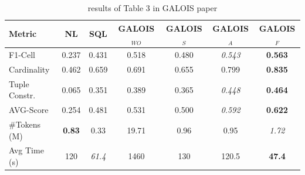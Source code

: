 \documentclass[11pt]{article}
\begin{document}
\begin{table}[H]
\centering
\caption{results of Table 3 in GALOIS paper}
\label{tab:galois_table3}
\begin{tabular}{lcccccc}
\hline
\textbf{Metric} 
& \textbf{NL} 
& \textbf{SQL} 
& \textbf{GALOIS$_{WO}$} 
& \textbf{GALOIS$_S$} 
& \textbf{GALOIS$_A$} 
& \textbf{GALOIS$_F$} \\
\hline
F1-Cell
& 0.237
& 0.431
& 0.518
& 0.480
& \textit{0.543}
& \textbf{0.563} \\

Cardinality
& 0.462
& 0.659
& 0.691
& 0.655
& 0.799
& \textbf{0.835} \\

Tuple Constr.
& 0.065
& 0.351
& 0.389
& 0.365
& \textit{0.448}
& \textbf{0.464} \\

AVG-Score
& 0.254
& 0.481
& 0.531
& 0.500
& \textit{0.592}
& \textbf{0.622} \\

\#Tokens (M)
& \textbf{0.83}
& 0.33
& 19.71
& 0.96
& 0.95
& \textit{1.72} \\

Avg Time (s)
& 120
& \textit{61.4}
& 1460
& 130
& 120.5
& \textbf{47.4} \\
\hline
\end{tabular}
\end{table}
\end{document}
